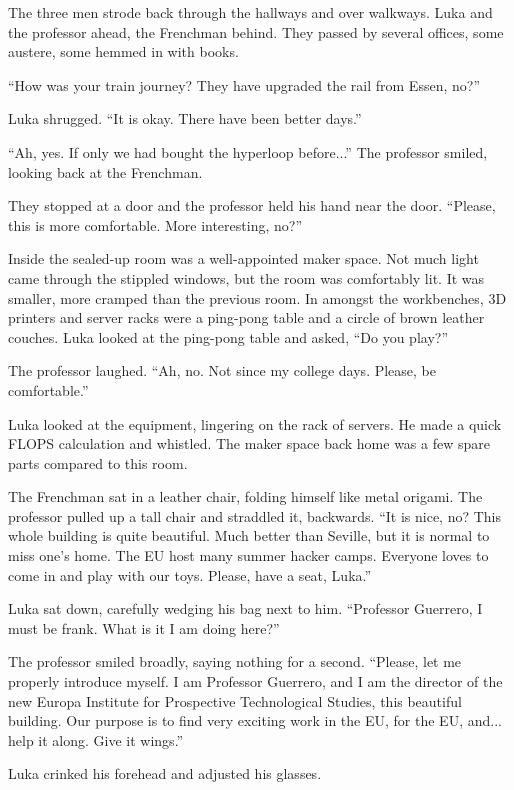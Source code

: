 \documentclass[ebook,11pt,oneside,openany]{memoir}
\begin{document}
The three men strode back through the hallways and over walkways. Luka and the professor ahead, the Frenchman behind. They passed by several offices, some austere, some hemmed in with books.

``How was your train journey? They have upgraded the rail from Essen, no?''

Luka shrugged. ``It is okay. There have been better days.''

``Ah, yes. If only we had bought the hyperloop before...'' The professor smiled, looking back at the Frenchman.

They stopped at a door and the professor held his hand near the door. ``Please, this is more comfortable. More interesting, no?''

Inside the sealed-up room was a well-appointed maker space. Not much light came through the stippled windows, but the room was comfortably lit. It was smaller, more cramped than the previous room. In amongst the workbenches, 3D printers and server racks were a ping-pong table and a circle of brown leather couches. Luka looked at the ping-pong table and asked, ``Do you play?''

The professor laughed. ``Ah, no. Not since my college days. Please, be comfortable.''

Luka looked at the equipment, lingering on the rack of servers. He made a quick FLOPS calculation and whistled. The maker space back home was a few spare parts compared to this room.

The Frenchman sat in a leather chair, folding himself like metal origami. The professor pulled up a tall chair and straddled it, backwards. ``It is nice, no? This whole building is quite beautiful. Much better than Seville, but it is normal to miss one's home. The EU host many summer hacker camps. Everyone loves to come in and play with our toys. Please, have a seat, Luka.''

Luka sat down, carefully wedging his bag next to him. ``Professor Guerrero, I must be frank. What is it I am doing here?''

The professor smiled broadly, saying nothing for a second. ``Please, let me properly introduce myself. I am Professor Guerrero, and I am the director of the new Europa Institute for Prospective Technological Studies, this beautiful building. Our purpose is to find very exciting work in the EU, for the EU, and... help it along. Give it wings.''

Luka crinked his forehead and adjusted his glasses.
\end{document}
